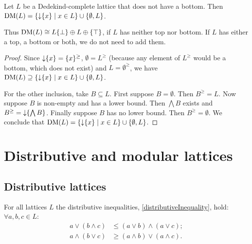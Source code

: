 \begin{proposition} \label{DMCompletionDedekindCompleteLattice}
Let $L$ be a Dedekind-complete lattice that does not have a bottom. Then $\DM(L) = \setbuilder{\downset\{x\}}{x\in L}\cup \{\emptyset, L\}$.
\end{proposition}
Thus $\operatorname{DM}(L) \cong L \{\bot\} \oplus L \oplus \{\top\}$, if $L$ has neither top nor bottom. If $L$ has either a top, a bottom or both, we do not need to add them.
\begin{proof}
Since $\operatorname{\downarrow} \{x\} = \{x\}^\geq$, $\emptyset = L^\geq$ (because any element of $L^\geq$ would be a bottom, which does not exist) and $L = \emptyset^\geq$, we have $\DM(L) \supseteq \setbuilder{\downset\{x\}}{x\in L}\cup \{\emptyset, L\}$.

For the other inclusion, take $B\subseteq L$. First suppose $B = \emptyset$. Then $B^\geq = L$. Now suppose $B$ is non-empty and has a lower bound. Then $\bigwedge B$ exists and $B^\geq = \operatorname{\downarrow}\{\bigwedge B\}$. Finally suppose $B$ has no lower bound. Then $B^\geq = \emptyset$. We conclude that $\DM(L) = \setbuilder{\downset\{x\}}{x\in L}\cup \{\emptyset, L\}$.
\end{proof}

\section{Distributive and modular lattices}
\subsection{Distributive lattices}
For all lattices $L$ the distributive inequalities, \ref{distributiveInequality}, hold: $\forall a,b,c \in L$:
\begin{align*}
a \vee (b\wedge c) &\leq (a\vee b) \wedge (a\vee c); \\
a\wedge (b \vee c) &\geq (a\wedge b)\vee (a\wedge c).
\end{align*}

